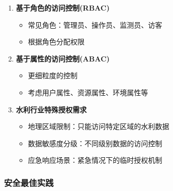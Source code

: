 \begin{enumerate}
\def\labelenumi{\arabic{enumi}.}
\tightlist
\item
  \textbf{基于角色的访问控制(RBAC)}

  \begin{itemize}
  \tightlist
  \item
    常见角色：管理员、操作员、监测员、访客
  \item
    根据角色分配权限
  \end{itemize}
\item
  \textbf{基于属性的访问控制(ABAC)}

  \begin{itemize}
  \tightlist
  \item
    更细粒度的控制
  \item
    考虑用户属性、资源属性、环境属性等
  \end{itemize}
\item
  \textbf{水利行业特殊授权需求}

  \begin{itemize}
  \tightlist
  \item
    地理区域限制：只能访问特定区域的水利数据
  \item
    数据敏感度分级：不同级别数据的访问控制
  \item
    应急响应场景：紧急情况下的临时授权机制
  \end{itemize}
\end{enumerate}

\subsubsection{安全最佳实践}\label{ux5b89ux5168ux6700ux4f73ux5b9eux8df5}

